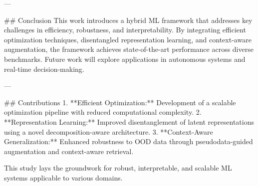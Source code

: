 ---

## Conclusion
This work introduces a hybrid ML framework that addresses key challenges in efficiency, robustness, and interpretability. By integrating efficient optimization techniques, disentangled representation learning, and context-aware augmentation, the framework achieves state-of-the-art performance across diverse benchmarks. Future work will explore applications in autonomous systems and real-time decision-making.

---

## Contributions
1. **Efficient Optimization:** Development of a scalable optimization pipeline with reduced computational complexity.
2. **Representation Learning:** Improved disentanglement of latent representations using a novel decomposition-aware architecture.
3. **Context-Aware Generalization:** Enhanced robustness to OOD data through pseudodata-guided augmentation and context-aware retrieval.

This study lays the groundwork for robust, interpretable, and scalable ML systems applicable to various domains.